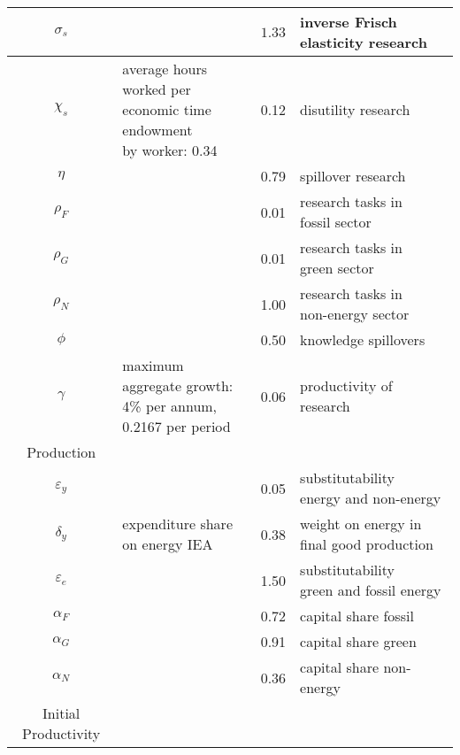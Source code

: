 \begin{table}[h!]
\begin{center}
\begin{tabular}{c|lll}
 			\hline
 			$\sigma_s$ &  \makecell[l]{\cite{Chetty2011AreMargins}}& $1.33$ & inverse Frisch elasticity research \\
 			\hline
 			$\chi_s$ &\makecell[l]{average hours worked per \\ economic time endowment\\ by worker: 0.34 \cite{OECDHoursworked}} & 0.12 & disutility research\\
 			\hline
 			$\eta$ &\makecell[l]{\cite{Fried2018ClimateAnalysis}} & 0.79 & spillover research\\
 			\hline			
 			$\rho_F$ &\makecell[l]{\cite{Fried2018ClimateAnalysis}} & 0.01 &\makecell[l]{research tasks in\\ fossil sector}\\
 			\hline			
 			$\rho_G$ &\makecell[l]{\cite{Fried2018ClimateAnalysis}} & 0.01 &\makecell[l]{research tasks in\\ green sector}\\
 			\hline			
 			$\rho_N$ &\makecell[l]{\cite{Fried2018ClimateAnalysis}} & 1.00 &\makecell[l]{research tasks in \\non-energy sector}\\
 			\hline			
 			$\phi$ &\makecell[l]{\cite{Fried2018ClimateAnalysis}} & 0.50 &knowledge spillovers\\
 			\hline
 			$\gamma$ &\makecell[l]{maximum aggregate growth:\\4\% per annum, 0.2167 per period} & 0.06 & productivity of research\\
 			\hline
 			\hline
 			Production&\multicolumn{3}{c}{}\\
 			\hline
 			
 			\hline
 			$\varepsilon_y$&\cite{Fried2018ClimateAnalysis}&0.05& \makecell[l]{substitutability \\ energy and non-energy}\\			
 			\hline
 			$\delta_y$&\makecell[l]{expenditure share \\ on energy IEA}&0.38& \makecell[l]{weight on energy in\\ final good production}\\	
 			\hline
 			$\varepsilon_e$&\cite{Fried2018ClimateAnalysis}&1.50& \makecell[l]{substitutability \\ green and fossil energy}\\	
 			\hline
 			$\alpha_F$&\cite{Fried2018ClimateAnalysis} &0.72& capital share fossil  \\
 			\hline
 			$\alpha_G$&\cite{Fried2018ClimateAnalysis} &0.91& capital share green \\
 			\hline
 			$\alpha_N$&\cite{Fried2018ClimateAnalysis} &0.36& capital share non-energy  \\
 			\hline
 			\hline
 			Initial Productivity&\multicolumn{3}{c}{}\\
 			\hline
 			

\end{tabular}
\end{center}
\end{table}
